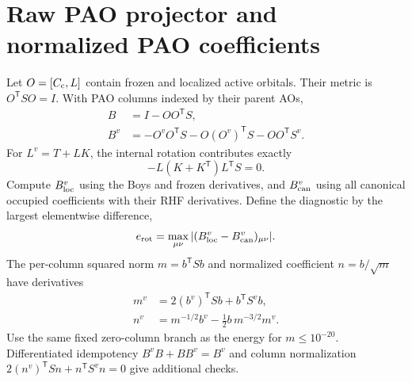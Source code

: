 \documentclass[11pt]{article}
\begin{document}
\section{Raw PAO projector and normalized PAO coefficients}
Let $O=[C_{\rm c},L]$ contain frozen and localized active orbitals. Their
metric is $O^{\mathsf T}SO=I$. With PAO columns indexed by their parent AOs,
\begin{align}
 B &= I-OO^{\mathsf T}S,\\
 B^v &=-O^v O^{\mathsf T}S-O(O^v)^{\mathsf T}S-OO^{\mathsf T}S^v .
\end{align}
For $L^v=T+LK$, the internal rotation contributes exactly
\begin{equation}
 -L(K+K^{\mathsf T})L^{\mathsf T}S=0 .
\end{equation}
Compute $B^v_{\rm loc}$ using the Boys and frozen derivatives, and
$B^v_{\rm can}$ using all canonical occupied coefficients with their RHF
derivatives. Define the diagnostic by the largest elementwise difference,
\begin{equation}
 e_{\rm rot}=\max_{\mu\nu}|(B^v_{\rm loc}-B^v_{\rm can})_{\mu\nu}|.
\end{equation}
The per-column squared norm $m=b^{\mathsf T}Sb$ and normalized coefficient
$n=b/\sqrt m$ have derivatives
\begin{align}
 m^v &=2(b^v)^{\mathsf T}Sb+b^{\mathsf T}S^v b,\\
 n^v &=m^{-1/2}b^v-\tfrac12 b\,m^{-3/2}m^v .
\end{align}
Use the same fixed zero-column branch as the energy for $m\le10^{-20}$.
Differentiated idempotency $B^vB+BB^v=B^v$ and column normalization
$2(n^v)^{\mathsf T}Sn+n^{\mathsf T}S^vn=0$ give additional checks.
\end{document}
